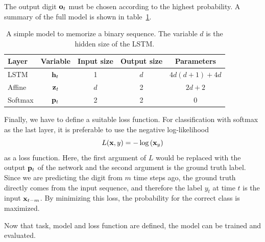 	The output digit $\mathbf{o}_t$ must be chosen according to the highest probability.
	A summary of the full model is shown in table~\ref{tbl:model_classification_binary_digits}.
	\begin{table}
		\small
		\begin{center}
			\begin{tabular}{|l|c|c|c|c|}
				\hline
				Layer 	& Variable 			& Input size 	& Output size 	& Parameters 			\\ \hline
				LSTM 	& $\mathbf{h}_t$		& 1 			& $d$ 			& $4d(d + 1) + 4d$ 		\\ \hline
				Affine 	& $\mathbf{z}_t$		& $d$ 			& 2 			& $2d + 2$ 				\\ \hline
				Softmax & $\mathbf{p}_t$		& 2 			& 2 			& 0						\\ \hline
			\end{tabular}
		\end{center}
		\caption[A simple model to memorize a binary sequence]
		{A simple model to memorize a binary sequence. The variable $d$ is the hidden size of the LSTM.}
		\label{tbl:model_classification_binary_digits}
	\end{table}
	Finally, we have to define a suitable loss function. 
	For classification with softmax as the last layer, it is preferable to use the negative log-likelihood
	\begin{equation}
		L(\mathbf{x}, y) = -\log\left(\mathbf{x}_y\right)
	\end{equation}
	as a loss function. 
	Here, the first argument of $L$ would be replaced with the output $\mathbf{p}_t$ of the network and the second argument is the ground truth label. 
	Since we are predicting the digit from $m$ time steps ago, the ground truth directly comes from the input sequence, and therefore the label $y_t$ at time $t$ is the input $\mathbf{x}_{t - m}$.
	By minimizing this loss, the probability for the correct class is maximized.
	
	Now that task, model and loss function are defined, the model can be trained and evaluated.
	
	
	
	
	
